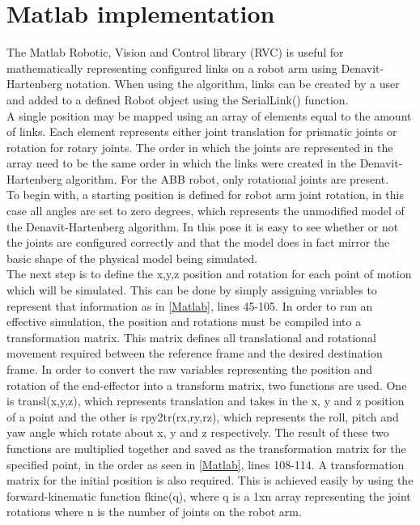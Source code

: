 \documentclass[11pt,a4paper]{report}
\begin{document}
\section{Matlab implementation}
The Matlab Robotic, Vision and Control library (RVC) is useful for mathematically representing configured links on a robot arm using Denavit-Hartenberg notation. When using the algorithm, links can be created by a user and added to a defined Robot object using the SerialLink() function.\\
A single position may be mapped using an array of elements equal to the amount of links. Each element represents either joint translation for prismatic joints or rotation for rotary joints. The order in which the joints are represented in the array need to be the same order in which the links were created in the Denavit-Hartenberg algorithm. For the ABB robot, only rotational joints are present.\\
To begin with, a starting position is defined for robot arm joint rotation, in this case all angles are set to zero degrees, which represents the unmodified model of the Denavit-Hartenberg algorithm. In this pose it is easy to see whether or not the joints are configured correctly and that the model does in fact mirror the basic shape of the physical model being simulated.\\
The next step is to define the x,y,z position and rotation for each point of motion which will be simulated. This can be done by simply assigning variables to represent that information as in \cref{Matlab}, lines 45-105. In order to run an effective simulation, the position and rotations must be compiled into a transformation matrix. This matrix defines all translational and rotational movement required between the reference frame and the desired destination frame. In order to convert the raw variables representing the position and rotation of the end-effector into a transform matrix, two functions are used. One is transl(x,y,z), which represents translation and takes in the x, y and z position of a point and the other is rpy2tr(rx,ry,rz), which represents the roll, pitch and yaw angle which rotate about x, y and z respectively. The result of these two functions are multiplied together and saved as the transformation matrix for the specified point, in the order as seen in \cref{Matlab}, lines 108-114. A transformation matrix for the initial position is also required. This is achieved easily by using the forward-kinematic function fkine(q), where q is a 1xn array representing the joint rotations where n is the number of joints on the robot arm.\\
\end{document}

